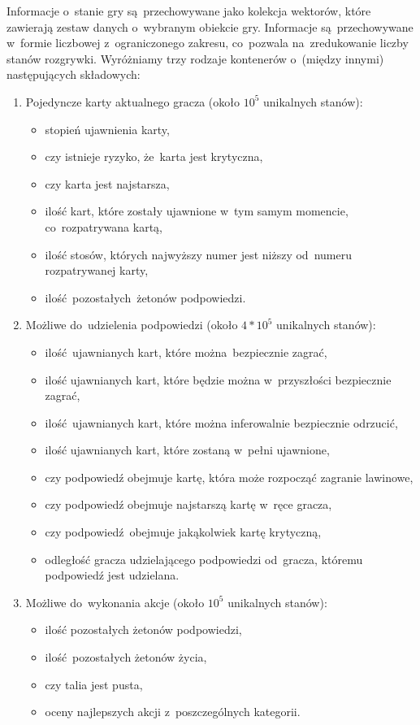 \documentclass[declaration,shortabstract,inz]{iithesis}
\begin{document}
Informacje o~stanie gry są~przechowywane jako kolekcja wektorów, które zawierają zestaw danych o~wybranym obiekcie gry. Informacje są~przechowywane w~formie liczbowej z~ograniczonego zakresu, co~pozwala na~zredukowanie liczby stanów rozgrywki. Wyróżniamy trzy rodzaje kontenerów o~(między innymi) następujących składowych:

\begin{enumerate}
	\item Pojedyncze karty aktualnego gracza (około $10^5$ unikalnych stanów):
		\begin{itemize}
			\item stopień ujawnienia karty,
			\item czy istnieje ryzyko, że~karta jest krytyczna,
			\item czy karta jest najstarsza,
			\item ilość kart, które zostały ujawnione w~tym samym momencie, co~rozpatrywana kartą,
			\item ilość stosów, których najwyższy numer jest niższy od~numeru rozpatrywanej karty,
			\item ilość pozostałych żetonów podpowiedzi.
		\end{itemize}
	\item Możliwe do~udzielenia podpowiedzi (około $4*10^5$ unikalnych stanów):
		\begin{itemize}
			\item ilość ujawnianych kart, które można bezpiecznie zagrać,
			\item ilość ujawnianych kart, które będzie można w~przyszłości bezpiecznie zagrać,
			\item ilość ujawnianych kart, które można inferowalnie bezpiecznie odrzucić,
			\item ilość ujawnianych kart, które zostaną w~pełni ujawnione,
			\item czy podpowiedź obejmuje kartę, która może rozpocząć zagranie lawinowe,
			\item czy podpowiedź obejmuje najstarszą kartę w~ręce gracza,
			\item czy podpowiedź obejmuje jakąkolwiek kartę krytyczną,
			\item odległość gracza udzielającego podpowiedzi od~gracza, któremu podpowiedź jest udzielana.
		\end{itemize}
	\item Możliwe do~wykonania akcje (około $10^5$ unikalnych stanów):
		\begin{itemize}
			\item ilość pozostałych żetonów podpowiedzi,
			\item ilość pozostałych żetonów życia,
			\item czy talia jest pusta,
			\item oceny najlepszych akcji z~poszczególnych kategorii.
		\end{itemize}
\end{enumerate}
\end{document}
